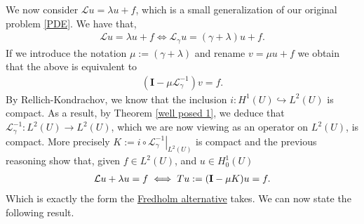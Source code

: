 \documentclass[
    a4paper,
    DIV=14,
    abstract=true,
    numbers=noenddot
]
{scrartcl}
\theoremstyle{definition}
\newcommand\restr[2]{\left.#1\right|_{#2}}
\newcommand{\Ll}{\mathcal{L}}
\begin{document}
We now consider $\Ll u =\lambda u+f$, which is a small generalization of our original problem \eqref{PDE}. We have that,
\begin{align*}
    \Ll u = \lambda u + f \iff  \Ll_\gamma u =(\gamma+\lambda)u +f.
\end{align*}
If we introduce the notation $\mu:=(\gamma+\lambda)$ and rename $v=\mu u +f$ we obtain that the above is equivalent to
\begin{align*}
    (\bm{I}- \mu \Ll_\gamma ^{-1}  )v =f.
\end{align*}
By Rellich-Kondrachov, we know that the inclusion $ i:H^1(U) \hookrightarrow L^2(U)$ is compact. As a result, by Theorem \ref{well posed 1}, we deduce that $\Ll_\gamma^{-1}: L^2(U) \to L^2(U)$, which we are now viewing as an operator on $L^2(U)$, is compact. More precisely $K:= i \circ \restr{\Ll_\gamma ^{-1}}{L^2(U)} $  is compact and the previous reasoning show that, given $f \in L^2(U)$, and $u \in H_0^1(U)$
\begin{align}\label{reasoning}
    \Ll u + \lambda u = f\iff Tu:=(\vb{I}-\mu K)u =f.
\end{align}
Which is exactly the form the \href{https://nowheredifferentiable.com/2023-05-30-PDE-2-Hilbert/#:~:text=Theorem%2010%20(-,Fredholm,-alternative).%20Let}{Fredholm alternative} takes. We can now state the following result.
\end{document}
